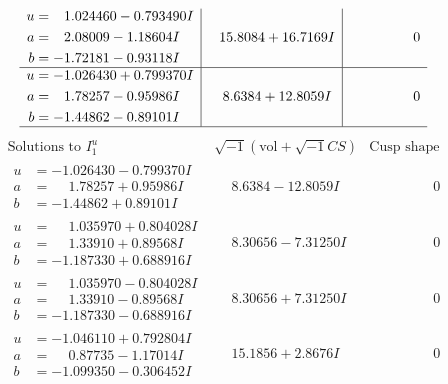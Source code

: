 \documentclass[1p]{elsarticle_modified}
\theoremstyle{definition}
\newcommand{\I}{\sqrt{-1}}
\begin{document}
$$\begin{array}{c|c|c}
\begin{aligned}
u &= \phantom{-}1.024460 - 0.793490 I \\
a &= \phantom{-}2.08009 - 1.18604 I \\
b &= -1.72181 - 0.93118 I\end{aligned}
 & \phantom{-}15.8084 + 16.7169 I & \phantom{-0.000000 } 0 \\ \hline\begin{aligned}
u &= -1.026430 + 0.799370 I \\
a &= \phantom{-}1.78257 - 0.95986 I \\
b &= -1.44862 - 0.89101 I\end{aligned}
 & \phantom{-}8.6384 + 12.8059 I & \phantom{-0.000000 } 0\\
 \hline 
 \end{array}$$\newpage$$\begin{array}{c|c|c}  
\text{Solutions to }I^u_{1}& \I (\text{vol} + \sqrt{-1}CS) & \text{Cusp shape}\\
 \hline 
\begin{aligned}
u &= -1.026430 - 0.799370 I \\
a &= \phantom{-}1.78257 + 0.95986 I \\
b &= -1.44862 + 0.89101 I\end{aligned}
 & \phantom{-}8.6384 - 12.8059 I & \phantom{-0.000000 } 0 \\ \hline\begin{aligned}
u &= \phantom{-}1.035970 + 0.804028 I \\
a &= \phantom{-}1.33910 + 0.89568 I \\
b &= -1.187330 + 0.688916 I\end{aligned}
 & \phantom{-}8.30656 - 7.31250 I & \phantom{-0.000000 } 0 \\ \hline\begin{aligned}
u &= \phantom{-}1.035970 - 0.804028 I \\
a &= \phantom{-}1.33910 - 0.89568 I \\
b &= -1.187330 - 0.688916 I\end{aligned}
 & \phantom{-}8.30656 + 7.31250 I & \phantom{-0.000000 } 0 \\ \hline\begin{aligned}
u &= -1.046110 + 0.792804 I \\
a &= \phantom{-}0.87735 - 1.17014 I \\
b &= -1.099350 - 0.306452 I\end{aligned}
 & \phantom{-}15.1856 + 2.8676 I & \phantom{-0.000000 } 0 \\ \hline\begin{aligned}

\end{aligned}
\end{array}$$
\end{document}
